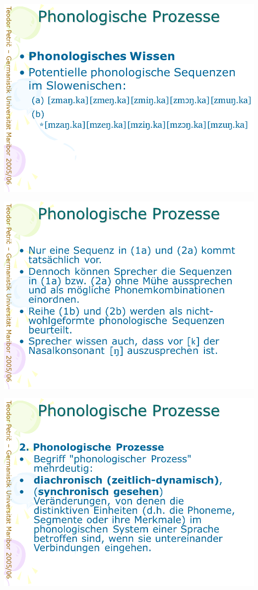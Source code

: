 \documentclass[
  letterpaper,
]{scrbook}
\begin{document}
\includegraphics[width=1\textwidth,height=\textheight]{./pictures/prozesse/prozesse_3.PNG}

\includegraphics[width=1\textwidth,height=\textheight]{./pictures/prozesse/prozesse_4.PNG}

\includegraphics[width=1\textwidth,height=\textheight]{./pictures/prozesse/prozesse_5.PNG}
\end{document}
